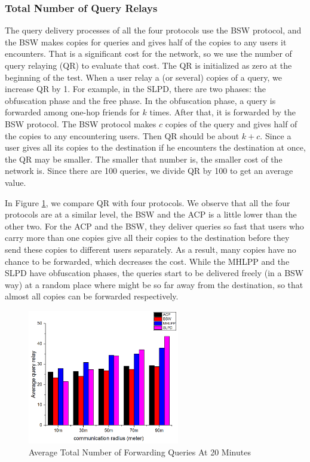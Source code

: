 \documentclass[conference]{IEEEtran}
\begin{document}
\subsubsection{ Total Number of Query Relays}

The query delivery processes of all the four protocols use the BSW protocol, and the BSW makes copies for queries and gives half of the copies to any users it encounters. That is a significant cost for the network, so we use the number of query relaying (QR) to evaluate that cost. The QR is initialized as zero at the beginning of the test. When a user relay a (or several) copies of a query, we increase QR by 1. For example, in the SLPD, there are two phases: the obfuscation phase and the free phase. In the obfuscation phase, a query is forwarded among one-hop friends for $k$ times. After that, it is forwarded by the BSW protocol. The BSW protocol makes $c$ copies of the query and gives half of the copies to any encountering users. Then QR should be about $k+c$. Since a user gives all its copies to the destination if he encounters the destination at once, the QR may be smaller. The smaller that number is, the smaller cost of the network is. Since there are 100 queries, we divide QR by 100 to get an average value. 

In Figure \ref{fig:F418AverageTotalNumberofForwardingQueriesAt20Minutes}, we compare QR with four protocols. We observe that all the four protocols are at a similar level, the BSW and the ACP is a little lower than the other two. For the ACP and the BSW, they deliver queries so fast that users who carry more than one copies give all their copies to the destination before they send these copies to different users separately. As a result, many copies have no chance to be forwarded, which decreases the cost. While the MHLPP and the SLPD have obfuscation phases, the queries start to be delivered freely (in a BSW way) at a random place where might be so far away from the destination, so that almost all copies can be forwarded respectively.

\begin{figure} [hbtp]
  \centering 
  \includegraphics[width=2.6in]{figures/F418AverageTotalNumberofForwardingQueriesAt20Minutes.png}
  \caption{Average Total Number of Forwarding Queries At 20 Minutes} 
  \label{fig:F418AverageTotalNumberofForwardingQueriesAt20Minutes} %
\end{figure}
\end{document}
